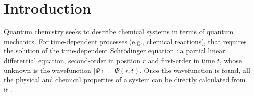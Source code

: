 \documentclass{aux/ttuthes2007}
\newcommand{\ket}[1]{\ensuremath{\left|#1\right\rangle}}
\begin{document}
\frontmatter






\tableofcontents	%





\listoffigures	%




\mainmatter


\chapter{\textbf{Introduction}}

Quantum chemistry  seeks to describe chemical systems in terms of quantum mechanics.
For time-dependent processes (e.g., chemical reactions), that requires the solution of the time-dependent Schrödinger equation : a partial linear differential equation, second-order in position $r$ and first-order in time $t$, whose unknown is the wavefunction $\ket \Psi = \Psi(r, t)$.
Once the wavefunction is found, all the physical and chemical properties of a system can be directly calculated from it .
\end{document}
